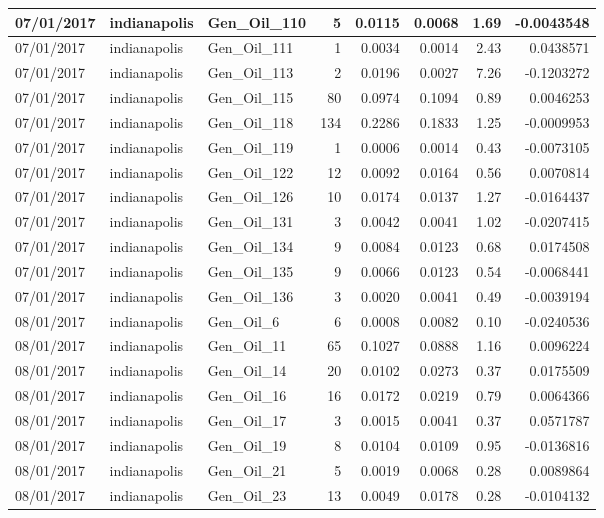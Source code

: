 \documentclass[
  letterpaper,
  DIV=11,
  numbers=noendperiod]{scrartcl}
\begin{document}
\begin{tabular}{l|l|l|r|r|r|r|r}
\hline
07/01/2017 & indianapolis & Gen\_Oil\_110 & 5 & 0.0115 & 0.0068 & 1.69 & -0.0043548\\
\hline
07/01/2017 & indianapolis & Gen\_Oil\_111 & 1 & 0.0034 & 0.0014 & 2.43 & 0.0438571\\
\hline
07/01/2017 & indianapolis & Gen\_Oil\_113 & 2 & 0.0196 & 0.0027 & 7.26 & -0.1203272\\
\hline
07/01/2017 & indianapolis & Gen\_Oil\_115 & 80 & 0.0974 & 0.1094 & 0.89 & 0.0046253\\
\hline
07/01/2017 & indianapolis & Gen\_Oil\_118 & 134 & 0.2286 & 0.1833 & 1.25 & -0.0009953\\
\hline
07/01/2017 & indianapolis & Gen\_Oil\_119 & 1 & 0.0006 & 0.0014 & 0.43 & -0.0073105\\
\hline
07/01/2017 & indianapolis & Gen\_Oil\_122 & 12 & 0.0092 & 0.0164 & 0.56 & 0.0070814\\
\hline
07/01/2017 & indianapolis & Gen\_Oil\_126 & 10 & 0.0174 & 0.0137 & 1.27 & -0.0164437\\
\hline
07/01/2017 & indianapolis & Gen\_Oil\_131 & 3 & 0.0042 & 0.0041 & 1.02 & -0.0207415\\
\hline
07/01/2017 & indianapolis & Gen\_Oil\_134 & 9 & 0.0084 & 0.0123 & 0.68 & 0.0174508\\
\hline
07/01/2017 & indianapolis & Gen\_Oil\_135 & 9 & 0.0066 & 0.0123 & 0.54 & -0.0068441\\
\hline
07/01/2017 & indianapolis & Gen\_Oil\_136 & 3 & 0.0020 & 0.0041 & 0.49 & -0.0039194\\
\hline
08/01/2017 & indianapolis & Gen\_Oil\_6 & 6 & 0.0008 & 0.0082 & 0.10 & -0.0240536\\
\hline
08/01/2017 & indianapolis & Gen\_Oil\_11 & 65 & 0.1027 & 0.0888 & 1.16 & 0.0096224\\
\hline
08/01/2017 & indianapolis & Gen\_Oil\_14 & 20 & 0.0102 & 0.0273 & 0.37 & 0.0175509\\
\hline
08/01/2017 & indianapolis & Gen\_Oil\_16 & 16 & 0.0172 & 0.0219 & 0.79 & 0.0064366\\
\hline
08/01/2017 & indianapolis & Gen\_Oil\_17 & 3 & 0.0015 & 0.0041 & 0.37 & 0.0571787\\
\hline
08/01/2017 & indianapolis & Gen\_Oil\_19 & 8 & 0.0104 & 0.0109 & 0.95 & -0.0136816\\
\hline
08/01/2017 & indianapolis & Gen\_Oil\_21 & 5 & 0.0019 & 0.0068 & 0.28 & 0.0089864\\
\hline
08/01/2017 & indianapolis & Gen\_Oil\_23 & 13 & 0.0049 & 0.0178 & 0.28 & -0.0104132\\

\end{tabular}
\end{document}
